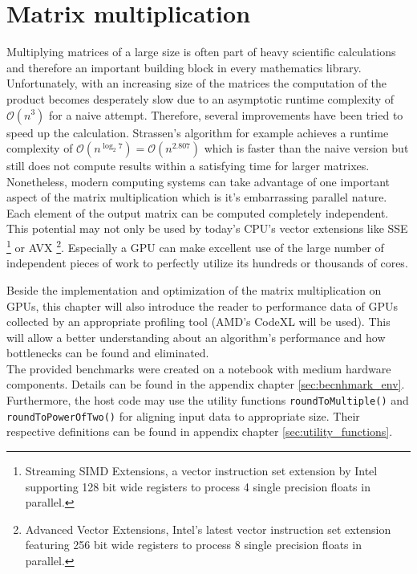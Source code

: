 \section{Matrix multiplication}
\label{sec:matrix_mul}

Multiplying matrices of a large size is often part of heavy scientific calculations and therefore an important building block in every mathematics library. Unfortunately, with an increasing size of the matrices the computation of the product becomes desperately slow due to an asymptotic runtime complexity of $\mathcal{O}(n^3)$ for a naive attempt. Therefore, several improvements have been tried to speed up the calculation. Strassen's algorithm for example achieves a runtime complexity of $\mathcal{O}(n^{\log_2 7}) = \mathcal{O}(n^{2.807})$ \cite{strassen} which is faster than the naive version but still does not compute results within a satisfying time for larger matrixes.
Nonetheless, modern computing systems can take advantage of one important aspect of the matrix multiplication which is it's embarrassing parallel nature. Each element of the output matrix can be computed completely independent. This potential may not only be used by today's CPU's vector extensions like SSE \footnote{Streaming SIMD Extensions, a vector instruction set extension by Intel supporting 128 bit wide registers to process 4 single precision floats in parallel.} or AVX \footnote{Advanced Vector Extensions, Intel's latest vector instruction set extension featuring 256 bit wide registers to process 8 single precision floats in parallel.}. Especially a GPU can make excellent use of the large number of independent pieces of work to perfectly utilize its hundreds or thousands of cores.

Beside the implementation and optimization of the matrix multiplication on GPUs, this chapter will also introduce the reader to performance data of GPUs collected by an appropriate profiling tool (AMD's CodeXL will be used). This will allow a better understanding about an algorithm's performance and how bottlenecks can be found and eliminated. \\
The provided benchmarks were created on a notebook with medium hardware components. Details can be found in the appendix chapter \ref{sec:becnhmark_env}. Furthermore, the host code may use the utility functions \lstinline!roundToMultiple()! and \lstinline!roundToPowerOfTwo()! for aligning input data to appropriate size. Their respective definitions can be found in appendix chapter \ref{sec:utility_functions}.

